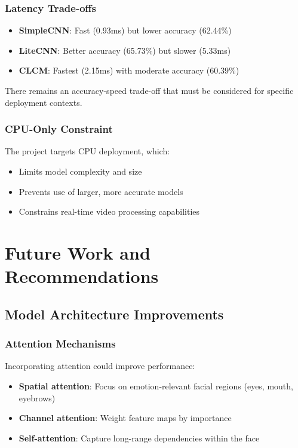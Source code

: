 \documentclass[12pt,a4paper]{article}
\begin{document}
\subsubsection{Latency Trade-offs}
\begin{itemize}[leftmargin=*]
    \item \textbf{SimpleCNN}: Fast (0.93ms) but lower accuracy (62.44\%)
    \item \textbf{LiteCNN}: Better accuracy (65.73\%) but slower (5.33ms)
    \item \textbf{CLCM}: Fastest (2.15ms) with moderate accuracy (60.39\%)
\end{itemize}
There remains an accuracy-speed trade-off that must be considered for specific deployment contexts.

\subsubsection{CPU-Only Constraint}
The project targets CPU deployment, which:
\begin{itemize}[leftmargin=*]
    \item Limits model complexity and size
    \item Prevents use of larger, more accurate models
    \item Constrains real-time video processing capabilities
\end{itemize}

\section{Future Work and Recommendations}

\subsection{Model Architecture Improvements}

\subsubsection{Attention Mechanisms}
Incorporating attention could improve performance:
\begin{itemize}[leftmargin=*]
    \item \textbf{Spatial attention}: Focus on emotion-relevant facial regions (eyes, mouth, eyebrows)
    \item \textbf{Channel attention}: Weight feature maps by importance
    \item \textbf{Self-attention}: Capture long-range dependencies within the face
\end{itemize}
\end{document}
